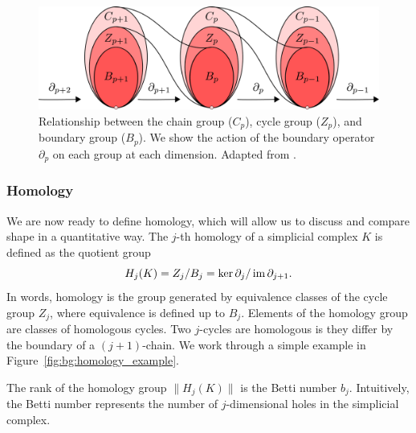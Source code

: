 

\begin{figure}
\centering
\includegraphics[width=\columnwidth]{./fig/FASY_chain_complexes.pdf}
\caption[Relationship between the chain group, cycle group, and boundary group.]{Relationship between the chain group ($C_p$), cycle group ($Z_p$), and boundary group ($B_p$). We show the action of the boundary operator $\partial_p$ on each group at each dimension. Adapted from \cite{Fasy:2014}.}
\label{fig:bg:chain_complexes}
\end{figure}

\subsubsection{Homology}
\label{bg:tda:math:homology}

We are now ready to define homology, which will allow us to discuss and compare shape in a quantitative way.
The $j$-th homology of a simplicial complex $K$ is defined as the quotient group
\begin{equation}
H_{j}(K) = Z_{j} / B_{j} = \ker\partial_{j} / \operatorname{im}\partial_{j+1}.
\end{equation}
In words, homology is the group generated by equivalence classes of the cycle group $Z_{j}$, where equivalence is defined up to $B_{j}$.
Elements of the homology group are classes of homologous cycles.
Two $j$-cycles are homologous is they differ by the boundary of a $(j+1)$-chain.
We work through a simple example in Figure~\ref{fig:bg:homology_example}.

The rank of the homology group $\|H_{j}(K)\|$ is the Betti number $b_j$.
Intuitively, the Betti number represents the number of $j$-dimensional holes in the simplicial complex.

